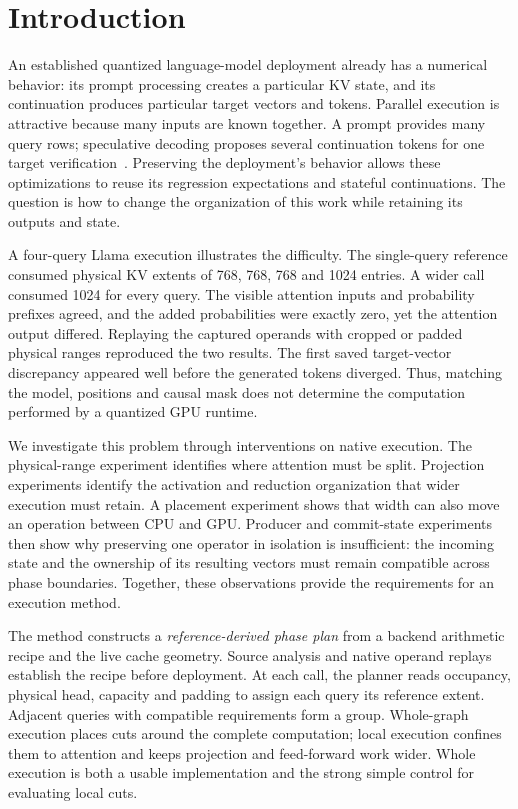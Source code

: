 \section{Introduction}
\label{sec:intro}
An established quantized language-model deployment already has a numerical behavior: its prompt processing creates a particular KV state, and its continuation produces particular target vectors and tokens. Parallel execution is attractive because many inputs are known together. A prompt provides many query rows; speculative decoding proposes several continuation tokens for one target verification~\cite{leviathan2023,chen2023}. Preserving the deployment's behavior allows these optimizations to reuse its regression expectations and stateful continuations. The question is how to change the organization of this work while retaining its outputs and state.

A four-query Llama execution illustrates the difficulty. The single-query reference consumed physical KV extents of 768, 768, 768 and 1024 entries. A wider call consumed 1024 for every query. The visible attention inputs and probability prefixes agreed, and the added probabilities were exactly zero, yet the attention output differed. Replaying the captured operands with cropped or padded physical ranges reproduced the two results. The first saved target-vector discrepancy appeared well before the generated tokens diverged. Thus, matching the model, positions and causal mask does not determine the computation performed by a quantized GPU runtime.

We investigate this problem through interventions on native execution. The physical-range experiment identifies where attention must be split. Projection experiments identify the activation and reduction organization that wider execution must retain. A placement experiment shows that width can also move an operation between CPU and GPU. Producer and commit-state experiments then show why preserving one operator in isolation is insufficient: the incoming state and the ownership of its resulting vectors must remain compatible across phase boundaries. Together, these observations provide the requirements for an execution method.

The method constructs a \emph{reference-derived phase plan} from a backend arithmetic recipe and the live cache geometry. Source analysis and native operand replays establish the recipe before deployment. At each call, the planner reads occupancy, physical head, capacity and padding to assign each query its reference extent. Adjacent queries with compatible requirements form a group. Whole-graph execution places cuts around the complete computation; local execution confines them to attention and keeps projection and feed-forward work wider. Whole execution is both a usable implementation and the strong simple control for evaluating local cuts.

